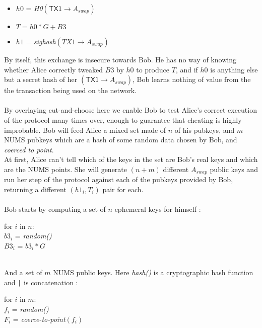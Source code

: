 \documentclass[12pt,a4paper]{article}
\begin{document}
\begin{footnotesize}
\begin{itemize}
\item $h0$ = \emph{H0}$(\textsf{TX1} \rightarrow A_{swap})$
\item $T = h0*G + B3$
\item $h1$ = \emph{sighash}$(TX1 \rightarrow A_{swap})$
\end{itemize}
\end{footnotesize}
By itself, this exchange is insecure towards Bob.  He has no way of knowing whether Alice correctly tweaked $B3$ by $h0$ to produce $T$, and if $h0$ is anything else but a secret hash of her $(\textsf{TX1} \rightarrow A_{swap})$, Bob learns nothing of value from the the transaction being used on the network.  \\ \\
By overlaying cut-and-choose here we enable Bob to test Alice's correct execution of the protocol many times over, enough to guarantee that cheating is highly improbable.  Bob will feed Alice a mixed set made of $n$ of his pubkeys, and $m$ NUMS pubkeys which are a hash of some random data chosen by Bob, and \emph{coerced to point}. \\
At first, Alice can't tell which of the keys in the set are Bob's real keys and which are the NUMS points.  She will generate $(n+m)$ different $A_{swap}$ public keys and run her step of the protocol against each of the pubkeys provided by Bob, returning a different $(h1_i, T_i)$ pair for each. \\ \\
Bob starts by computing a set of $n$ ephemeral keys for himself : \\
\begin{footnotesize}
for $i$ in $n$: \\
	\indent $b3_i$ = \emph{random()} \\
    \indent $B3_i$ = $b3_i * G$ \\
\end{footnotesize}
\\
And a set of $m$ NUMS public keys.  Here \emph{hash()} is a cryptographic hash function and \texttt{|} is concatenation : \\
\begin{footnotesize}
for $i$ in $m$: \\
    \indent $f_i$ = \emph{random()} \\
    \indent $F_i$ = \emph{coerce-to-point}$(f_i)$ \\
\end{footnotesize} \\
\end{document}
